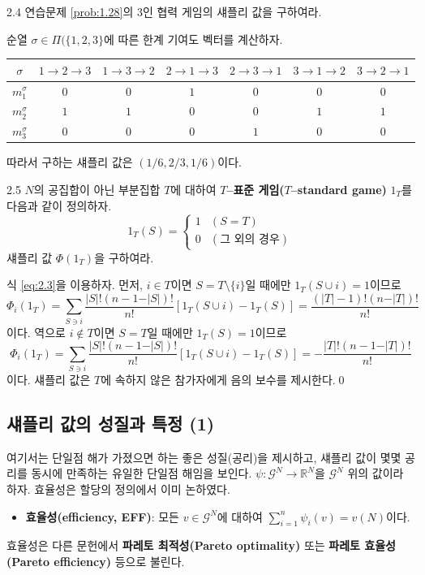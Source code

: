 \documentclass{article}
\numberwithin{equation}{section}
\begin{document}
\begin{prob}{}{2.4}
	연습문제 \ref{prob:1.28}의 $3$인 협력 게임의 섀플리 값을 구하여라.
\end{prob}

\begin{sol}
	순열 $\sigma\in\Pi(\{1,2,3\}$에 따른 한계 기여도 벡터를 계산하자.
	\begin{table}[H]
		\centering
		\begin{tabular}{c|cccccc}
			\toprule
			$\sigma$ & $1\rightarrow 2\rightarrow 3$ & $1\rightarrow 3\rightarrow 2$ & $2\rightarrow 1\rightarrow 3$ & $2\rightarrow 3\rightarrow 1$ & $3\rightarrow 1\rightarrow 2$ & $3\rightarrow 2\rightarrow 1$\\
			\midrule
			$m^\sigma_1$ & $0$ & $0$ & $1$ & $0$ & $0$ & $0$\\
			\midrule
			$m^\sigma_2$ & $1$ & $1$ & $0$ & $0$ & $1$ & $1$\\
			\midrule
			$m^\sigma_3$ & $0$ & $0$ & $0$ & $1$ & $0$ & $0$\\
			\bottomrule
		\end{tabular}
	\end{table}
	따라서 구하는 섀플리 값은 $(1/6,2/3,1/6)$이다.
\end{sol}

\begin{prob}{}{2.5}
	$N$의 공집합이 아닌 부분집합 $T$에 대하여 \textbf{$T$--표준 게임($T$--standard game)} $1_T$를 다음과 같이 정의하자.
	\[
		1_T(S)=\begin{cases}
			1 & (S=T)\\
			0 & (\text{그 외의 경우})
		\end{cases}
	\]
	섀플리 값 $\Phi(1_T)$을 구하여라.
\end{prob}

\begin{sol}
	식 \ref{eq:2.3}을 이용하자. 먼저, $i\in T$이면 $S=T\setminus\{i\}$일 때에만 $1_T(S\cup i)=1$이므로
	\[
		\Phi_i(1_T)=\sum_{S\ni i}\frac{\vert S\vert!(n-1-\vert S\vert)!}{n!}[1_T(S\cup i)-1_T(S)]=\frac{(\vert T\vert-1)!(n-\vert T\vert)!}{n!}
	\]
	이다. 역으로 $i\notin T$이면 $S=T$일 때에만 $1_T(S)=1$이므로
	\[
		\Phi_i(1_T)=\sum_{S\ni i}\frac{\vert S\vert!(n-1-\vert S\vert)!}{n!}[1_T(S\cup i)-1_T(S)]=-\frac{\vert T\vert!(n-1-\vert T\vert)!}{n!}
	\]
	이다. 섀플리 값은 $T$에 속하지 않은 참가자에게 음의 보수를 제시한다.\qed
\end{sol}


\subsection{섀플리 값의 성질과 특정 (1)}
여기서는 단일점 해가 가졌으면 하는 좋은 성질(공리)을 제시하고, 섀플리 값이 몇몇 공리를 동시에 만족하는 유일한 단일점 해임을 보인다. $\psi:\mathcal G^N\to\mathbb R^N$을 $\mathcal G^N$ 위의 값이라 하자. 효율성은 할당의 정의에서 이미 논하였다.
\begin{itemize}
	\item \textbf{효율성(efficiency, EFF)}: 모든 $v\in\mathcal G^N$에 대하여 $\sum_{i=1}^n\psi_i(v)=v(N)$이다.
\end{itemize}
효율성은 다른 문헌에서 \textbf{파레토 최적성(Pareto optimality)} 또는 \textbf{파레토 효율성(Pareto efficiency)} 등으로 불린다.
\end{document}
